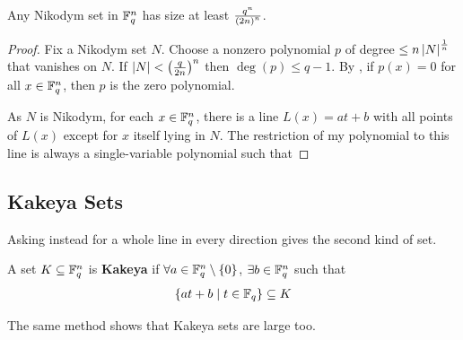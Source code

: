 \begin{boxtheorem}[Dvir, 2008]
    Any Nikodym set in $\mathbb{F}_q^n$ has size at least $\frac{q^n}{\left( 2n \right)^n}$.
\end{boxtheorem}
\begin{proof}
    Fix a Nikodym set $N$. Choose a nonzero polynomial $p$ of degree $\leq n \left\lvert N \right\rvert^{\frac{1}{n}}$ that vanishes on $N$. If $\left\lvert N \right\rvert < \left( \frac{q}{2n} \right)^n$ then $\deg(p) \leq q - 1$. By , if $p(x) = 0$ for all $x \in \mathbb{F}_q^n$, then $p$ is the zero polynomial.

    As $N$ is Nikodym, for each $x \in \mathbb{F}_q^n$, there is a line $L(x) = at + b$ with all points of $L(x)$ except for $x$ itself lying in $N$. The restriction of my polynomial to this line is always a single-variable polynomial such that \sorry
\end{proof}

\subsection{Kakeya Sets}

Asking instead for a whole line in every direction gives the second kind of set.

\begin{boxdefinition}
    A set $K \subseteq \mathbb{F}_q^n$ is \textbf{Kakeya} if $\forall a \in \mathbb{F}_q^n \setminus \left\{ 0 \right\}$, $\exists b \in \mathbb{F}_q^n$ such that
    \begin{align*}
        \left\{ at + b \; \middle\vert \; t \in \mathbb{F}_q \right\} \subseteq K
    \end{align*}
\end{boxdefinition}

The same method shows that Kakeya sets are large too.

